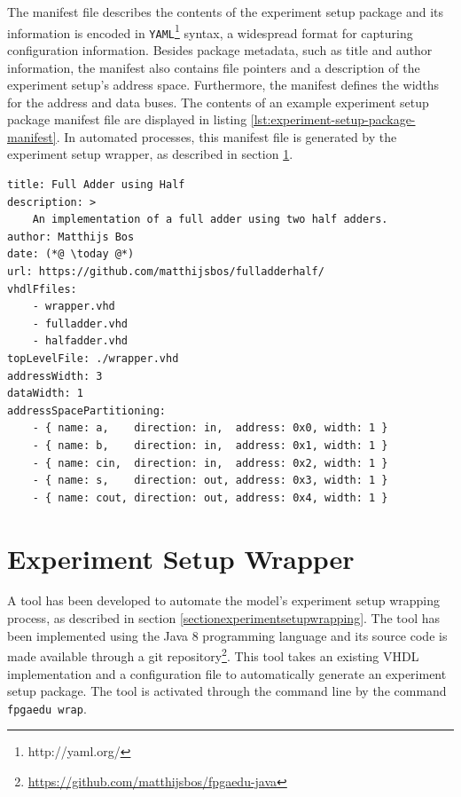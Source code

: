 \documentclass[main.tex]{subfiles}
\begin{document}
The manifest file describes the contents of the experiment setup package and its information is encoded in \texttt{YAML}\footnote{http://yaml.org/} syntax, a widespread format for capturing configuration information. Besides package metadata, such as title and author information, the manifest also contains file pointers and a description of the experiment setup's address space. Furthermore, the manifest defines the widths for the address and data buses. The contents of an example experiment setup package manifest file are displayed in listing \ref{lst:experiment-setup-package-manifest}. In automated processes, this manifest file is generated by the experiment setup wrapper, as described in section \ref{section:experiment_setup_wrapper}.

\begin{lstlisting}[caption={Example experiment setup package \texttt{manifest.yaml}}, label={lst:experiment-setup-package-manifest}]
title: Full Adder using Half
description: >
    An implementation of a full adder using two half adders.
author: Matthijs Bos
date: (*@ \today @*)
url: https://github.com/matthijsbos/fulladderhalf/
vhdlFfiles: 
    - wrapper.vhd
    - fulladder.vhd
    - halfadder.vhd
topLevelFile: ./wrapper.vhd
addressWidth: 3
dataWidth: 1
addressSpacePartitioning:
    - { name: a,    direction: in,  address: 0x0, width: 1 }
    - { name: b,    direction: in,  address: 0x1, width: 1 }
    - { name: cin,  direction: in,  address: 0x2, width: 1 }
    - { name: s,    direction: out, address: 0x3, width: 1 }
    - { name: cout, direction: out, address: 0x4, width: 1 }
\end{lstlisting}






\section{Experiment Setup Wrapper}
\label{section:experiment_setup_wrapper}
A tool has been developed to automate the model's experiment setup wrapping process, as described in section \ref{sectionexperimentsetupwrapping}. The tool has been implemented using the Java 8 programming language and its source code is made available through a git repository\footnote{\url{https://github.com/matthijsbos/fpgaedu-java}}. This tool takes an existing VHDL implementation and a configuration file to automatically generate an experiment setup package. The tool is activated through the command line by the command \texttt{fpgaedu wrap}.
\end{document}
